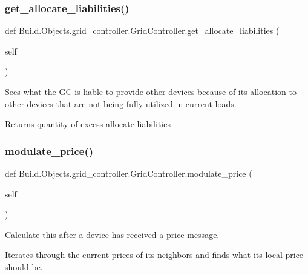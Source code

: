\subsubsection{\texorpdfstring{get\+\_\+allocate\+\_\+liabilities()}{get\_allocate\_liabilities()}}
{\footnotesize\ttfamily def Build.\+Objects.\+grid\+\_\+controller.\+Grid\+Controller.\+get\+\_\+allocate\+\_\+liabilities (\begin{DoxyParamCaption}\item[{}]{self }\end{DoxyParamCaption})}



Sees what the GC is liable to provide other devices because of its allocation to other devices that are not being fully utilized in current loads. 

\begin{DoxyReturn}{Returns}
quantity of excess allocate liabilities 
\end{DoxyReturn}
\mbox{\label{class_build_1_1_objects_1_1grid__controller_1_1_grid_controller_a8613a7012fcafee53dafc0abe1d71919}} 
\subsubsection{\texorpdfstring{modulate\+\_\+price()}{modulate\_price()}}
{\footnotesize\ttfamily def Build.\+Objects.\+grid\+\_\+controller.\+Grid\+Controller.\+modulate\+\_\+price (\begin{DoxyParamCaption}\item[{}]{self }\end{DoxyParamCaption})}



Calculate this after a device has received a price message. 

Iterates through the current prices of its neighbors and finds what its local price should be. \mbox{\label{class_build_1_1_objects_1_1grid__controller_1_1_grid_controller_ad917e30e3b828571c02657d8052cf075}} 
